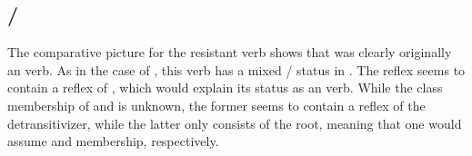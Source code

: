 

\subsection{\trio {}/ }
\label{sec:shit}
The comparative picture for the resistant \trio {} verb   shows that  was clearly originally an  verb.
As in the case of  , this verb has a mixed / status in \wayana.
The \bakairi reflex  seems to contain a reflex of , which would explain its status as an  verb.
While the class membership of \panare {} and   is unknown, the former seems to contain a reflex of the detransitivizer, while the latter only consists of the root, meaning that one would assume  and  membership, respectively.


%
%
